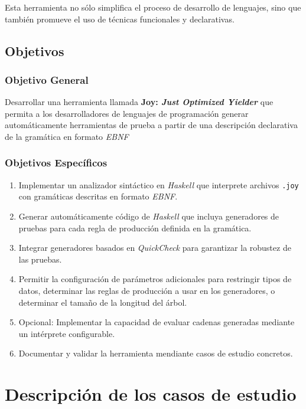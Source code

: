 \documentclass[12pt]{article}
\begin{document}
Esta herramienta no sólo simplifica el proceso de desarrollo de lenguajes, sino que también promueve el uso de técnicas funcionales y declarativas.

\subsection*{Objetivos}

\subsubsection*{Objetivo General}

Desarrollar una herramienta llamada \textbf{Joy: \textit{Just Optimized Yielder}} que permita a los desarrolladores de lenguajes de programación generar automáticamente herramientas de prueba a partir de una descripción declarativa de la gramática en formato \textit{EBNF}

\subsubsection*{Objetivos Específicos}

\begin{enumerate}
\item Implementar un analizador sintáctico en \textit{Haskell} que interprete archivos \texttt{.joy} con gramáticas descritas en formato \textit{EBNF}.
\item Generar automáticamente código de \textit{Haskell} que incluya generadores de pruebas para cada regla de producción definida en la gramática.
\item Integrar generadores basados en \textit{QuickCheck} para garantizar la robustez de las pruebas.
\item Permitir la configuración de parámetros adicionales para restringir tipos de datos, determinar las reglas de producción a usar en los generadores, o determinar el tamaño de la longitud del árbol.
\item Opcional: Implementar la capacidad de evaluar cadenas generadas mediante un intérprete configurable.
\item Documentar y validar la herramienta mendiante casos de estudio concretos.
\end{enumerate}

\section*{Descripción de los casos de estudio}
\end{document}
